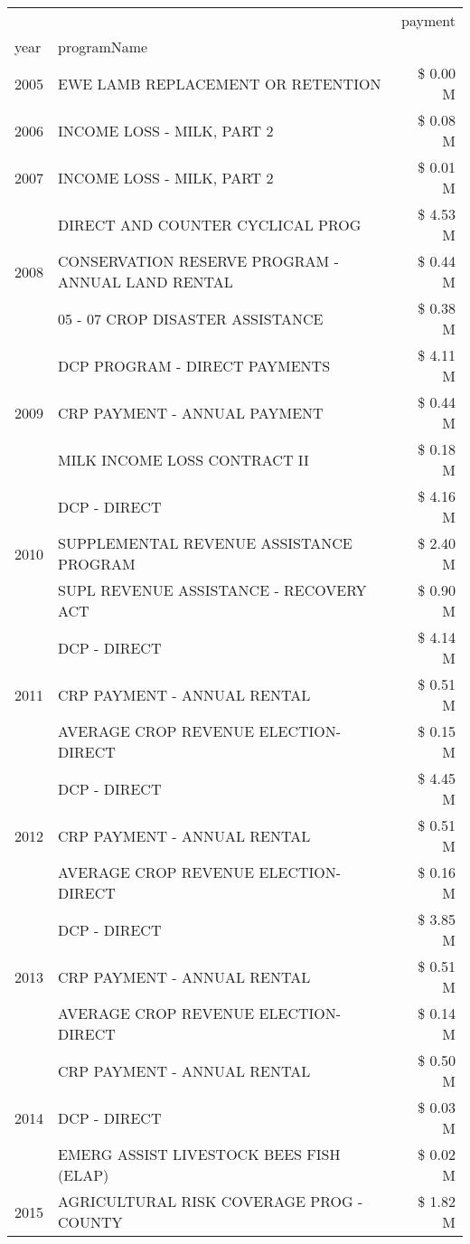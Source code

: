 \begin{tabular}{llr}
\toprule
 &  & payment \\
year & programName &  \\
\midrule
2005 & EWE LAMB REPLACEMENT OR RETENTION & \$ 0.00 M \\
\cline{1-3}
2006 & INCOME LOSS - MILK, PART 2 & \$ 0.08 M \\
\cline{1-3}
2007 & INCOME LOSS - MILK, PART 2 & \$ 0.01 M \\
\cline{1-3}
\multirow[t]{3}{*}{2008} & DIRECT AND COUNTER CYCLICAL PROG & \$ 4.53 M \\
 & CONSERVATION RESERVE PROGRAM - ANNUAL LAND RENTAL & \$ 0.44 M \\
 & 05 - 07 CROP DISASTER ASSISTANCE & \$ 0.38 M \\
\cline{1-3}
\multirow[t]{3}{*}{2009} & DCP PROGRAM - DIRECT PAYMENTS & \$ 4.11 M \\
 & CRP PAYMENT - ANNUAL PAYMENT & \$ 0.44 M \\
 & MILK INCOME LOSS CONTRACT II & \$ 0.18 M \\
\cline{1-3}
\multirow[t]{3}{*}{2010} & DCP - DIRECT & \$ 4.16 M \\
 & SUPPLEMENTAL REVENUE ASSISTANCE PROGRAM & \$ 2.40 M \\
 & SUPL REVENUE ASSISTANCE - RECOVERY ACT & \$ 0.90 M \\
\cline{1-3}
\multirow[t]{3}{*}{2011} & DCP - DIRECT & \$ 4.14 M \\
 & CRP PAYMENT - ANNUAL RENTAL & \$ 0.51 M \\
 & AVERAGE CROP REVENUE ELECTION-DIRECT & \$ 0.15 M \\
\cline{1-3}
\multirow[t]{3}{*}{2012} & DCP - DIRECT & \$ 4.45 M \\
 & CRP PAYMENT - ANNUAL RENTAL & \$ 0.51 M \\
 & AVERAGE CROP REVENUE ELECTION-DIRECT & \$ 0.16 M \\
\cline{1-3}
\multirow[t]{3}{*}{2013} & DCP - DIRECT & \$ 3.85 M \\
 & CRP PAYMENT - ANNUAL RENTAL & \$ 0.51 M \\
 & AVERAGE CROP REVENUE ELECTION-DIRECT & \$ 0.14 M \\
\cline{1-3}
\multirow[t]{3}{*}{2014} & CRP PAYMENT - ANNUAL RENTAL & \$ 0.50 M \\
 & DCP - DIRECT & \$ 0.03 M \\
 & EMERG ASSIST LIVESTOCK BEES FISH (ELAP) & \$ 0.02 M \\
\cline{1-3}
\multirow[t]{3}{*}{2015} & AGRICULTURAL RISK COVERAGE PROG - COUNTY & \$ 1.82 M \\

\end{tabular}

